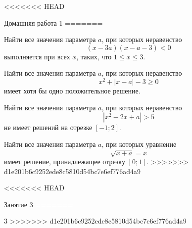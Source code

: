 \begin{homework}[number=1]
	\begin{listofex}
<<<<<<< HEAD
		\item Домашняя работа 1
=======
		\item Найти все значения параметра \( a \), при которых неравенство
		\[ (x-3a)(x-a-3)<0 \]
		выполняется при всех \( x \), таких, что \( 1\le x \le 3 \).
		\item Найти все значения параметра \( a \), при которых неравенство
		\[ x^2+|x-a|-3\ge0 \]
		имеет хотя бы одно положительное решение.
		\item Найти все значения параметра \( a \), при которых неравенство
		\[ |x^2-2x+a| > 5 \]
		не имеет решений на отрезке \( [-1;2] \).
		\item Найти все значения параметра \( a \), при которых уравнение
		\[ \sqrt{x+a}=x \]
		имеет решение, принадлежащее отрезку \( [0;1] \).
>>>>>>> d1e201b6c9252ede8c5810d54bc7e6ef776ad4a9
	\end{listofex}
\end{homework}

\begin{class}[number=3]
	\begin{listofex}
<<<<<<< HEAD
		\item Занятие 3 
=======
		\item 3
>>>>>>> d1e201b6c9252ede8c5810d54bc7e6ef776ad4a9
	\end{listofex}
\end{class}

